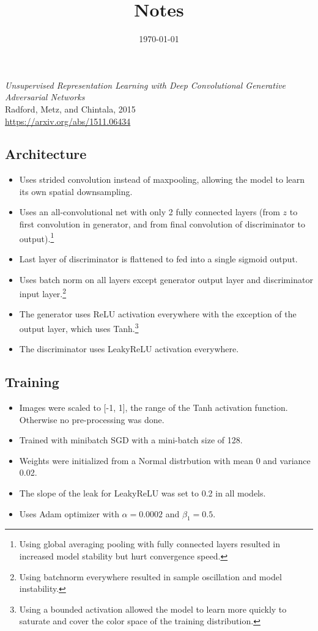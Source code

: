 \documentclass{article}
\date{\today}
\title{Notes}
\begin{document}
\begin{flushleft}
  \emph{Unsupervised Representation Learning with Deep Convolutional Generative Adversarial Networks}\\
  Radford, Metz, and Chintala, 2015\\
  \href{https://arxiv.org/abs/1511.06434}{https://arxiv.org/abs/1511.06434}\\

  \subsection*{Architecture}
  \begin{itemize}

  \item Uses strided convolution instead of maxpooling, allowing the model to learn its own spatial downsampling.
  \item Uses an all-convolutional net with only 2 fully connected layers (from $z$ to first convolution in generator, and from final convolution of discriminator to output).\footnote{Using global averaging pooling with fully connected layers resulted in increased model stability but hurt convergence speed.}
  \item Last layer of discriminator is flattened to fed into a single sigmoid output.
  \item Uses batch norm on all layers except generator output layer and discriminator input layer.\footnote{Using batchnorm everywhere resulted in sample oscillation and model instability.}
  \item The generator uses ReLU activation everywhere with the exception of the output layer, which uses Tanh.\footnote{Using a bounded activation allowed the model to learn more quickly to saturate and cover the color space of the training distribution.}
  \item The discriminator uses LeakyReLU activation everywhere. 
  \end{itemize}

  \subsection*{Training}

  \begin{itemize}
  \item Images were scaled to [-1, 1], the range of the Tanh activation function. Otherwise no pre-processing was done.
  \item Trained with minibatch SGD with a mini-batch size of 128.
  \item Weights were initialized from a Normal distrbution with mean 0 and variance 0.02.
  \item The slope of the leak for LeakyReLU was set to 0.2 in all models.
  \item Uses Adam optimizer with $\alpha = 0.0002$ and $\beta_1 = 0.5$.
  \end{itemize}
  
\end{flushleft}



\end{document}
